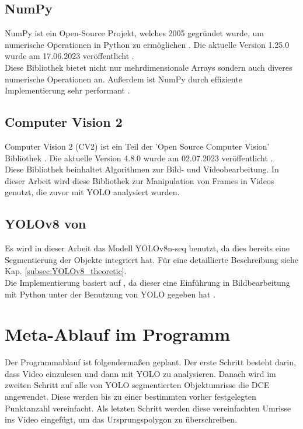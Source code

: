 	\subsection{NumPy}
	{ \label{subsec:NumPy}
	NumPy ist ein Open-Source Projekt, welches 2005 gegründet wurde, um numerische Operationen in Python zu ermöglichen \citep{numpy_about}. Die aktuelle Version 1.25.0 wurde am 17.06.2023 veröffentlicht \citep{numpy_main_web}. \\
	Diese Bibliothek bietet nicht nur mehrdimensionale Arrays sondern auch diveres numerische Operationen an. Außerdem ist NumPy durch effiziente Implementierung sehr performant \citep{numpy_main_web}. \\
	}
	\subsection{Computer Vision 2}
	{ \label{subsec:Computer_Vision_2}
	Computer Vision 2 (CV2) ist ein Teil der 'Open Source Computer Vision' Bibliothek \citep{opencv_about}. Die aktuelle Version 4.8.0 wurde am 02.07.2023 veröffentlicht \citep{opencv_release}. \\
	Diese Bibliothek beinhaltet Algorithmen zur Bild- und Videobearbeitung. In dieser Arbeit wird diese Bibliothek zur Manipulation von Frames in Videos genutzt, die zuvor mit YOLO analysiert wurden. 
	}
	\subsection{YOLOv8 von \citeauthor{Canu_pysource}}
	{ \label{YOLOv8_canu}
	 Es wird in dieser Arbeit das Modell YOLOv8n-seq benutzt, da dies bereits eine Segmentierung der Objekte integriert hat. Für eine detaillierte Beschreibung siehe Kap. \ref{subsec:YOLOv8_theoretic}. \\
	 Die Implementierung basiert auf \citeauthor{Canu_pysource}, da dieser eine Einführung in Bildbearbeitung mit Python unter der Benutzung von YOLO gegeben hat \citep{Canu_pysource}.
	}
\section{Meta-Ablauf im Programm}{
	Der Programmablauf ist folgendermaßen geplant. Der erste Schritt besteht darin, dass Video einzulesen und dann mit YOLO zu analysieren. Danach wird im zweiten Schritt auf alle von YOLO segmentierten Objektumrisse die DCE angewendet. Diese werden bis zu einer bestimmten vorher festgelegten Punktanzahl vereinfacht. Als letzten Schritt werden diese vereinfachten Umrisse ins Video eingefügt, um das Ursprungspolygon zu überschreiben.
}


